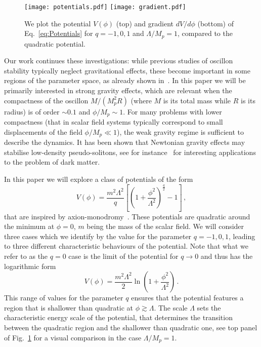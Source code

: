 \documentclass[11pt,a4paper]{article}
\begin{document}
\begin{figure}\centering
\texttt{[image: potentials.pdf]}
\texttt{[image: gradient.pdf]}
\caption{We plot the potential $V(\phi)$ (top) and gradient $dV/d\phi$ (bottom) of Eq.~\eqref{eq:Potentials} for $q = -1, 0, 1$ and $\Lambda/M_p=1$, compared to the quadratic potential.
\label{fig:Potentials}}
\end{figure}

Our work continues these investigations: while previous studies of oscillon stability typically neglect gravitational effects, these become important in some regions of the parameter space, as already shown in~\cite{1807.09795, 1609.04724, 1708.01344, 1906.09346, 1907.10613, 1912.09658}. In this paper we will be primarily interested in strong gravity effects, which are relevant when the compactness of the oscillon $M/(M_p^2 R)$ (where $M$ is its total mass while $R$ is its radius) is of order $\sim 0.1$ and $\phi/M_p \sim 1$. For many problems with lower compactness (that in scalar field systems typically correspond to small displacements of the field $\phi/M_p \ll 1$), the weak gravity regime is sufficient to describe the dynamics. It has been shown that Newtonian gravity effects may stabilise low-density pseudo-solitons, see for instance~\cite{Hu:2000ke, Marsh:2013ywa, Schive:2014dra, Schive:2014hza, Hui:2016ltb, Marsh:2015wka} for interesting applications to the problem of dark matter.

In this paper we will explore a class of potentials of the form
\begin{equation}
V(\phi)=\frac{m^2 \Lambda^2}{q}\left[ \left(1+\frac{\phi^2}{\Lambda^2}\right)^{\frac{q}{2}}-1\right] \,,
\label{eq:Potentials}
\end{equation}
that are inspired by axion-monodromy~\cite{0803.3085, McAllister:2014mpa}. These potentials are quadratic around the minimum at $\phi=0$, $m$ being the mass of the scalar field. We will consider three cases which we identify by the value for the parameter $q=-1,0,1$, leading to three different characteristic behaviours of the potential. Note that what we refer to as the $q=0$ case is the limit of the potential for $q \rightarrow 0$ and thus has the logarithmic form
\begin{equation}
V(\phi)=\frac{m^2 \Lambda^2}{2} \ln \left(1+\frac{ \phi^2}{\Lambda^2}\right) \,.
\end{equation}
This range of values for the parameter $q$ ensures that the potential features a region that is shallower than quadratic at $\phi \gtrsim \Lambda$. The scale $\Lambda$ sets the characteristic energy scale of the potential, that determines the transition between the quadratic region and the shallower than quadratic one, see top panel of Fig.~\ref{fig:Potentials} for a visual comparison in the case $\Lambda/M_p = 1$.
\end{document}

